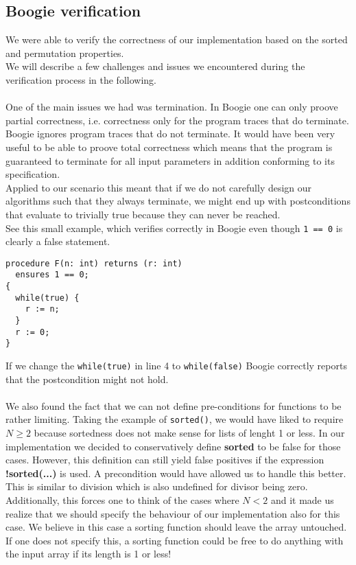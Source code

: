 \documentclass{report}
\begin{document}
\subsection{Boogie verification}
\label{s:boogie_verification}
We were able to verify the correctness of our implementation based on the sorted and permutation properties.\\
We will describe a few challenges and issues we encountered during the verification process in the following.
\\\\
One of the main issues we had was termination. In Boogie one can only proove partial correctness, i.e. correctness only for the program traces that do terminate.
Boogie ignores program traces that do not terminate. It would have been very useful to be able to proove total correctness which means that the program is
guaranteed to terminate for all input parameters in addition conforming to its specification.\\
Applied to our scenario this meant that if we do not carefully design our algorithms such that they always terminate, we might end up with postconditions that evaluate to trivially true because they can never be reached.\\
See this small example, which verifies correctly in Boogie even though \texttt{1 == 0} is clearly a false statement.
\begin{lstlisting}
procedure F(n: int) returns (r: int)
  ensures 1 == 0;
{
  while(true) {
    r := n;
  }
  r := 0;
}
\end{lstlisting}
If we change the \texttt{while(true)} in line 4 to \texttt{while(false)} Boogie correctly reports that the postcondition might not hold.
\\\\
We also found the fact that we can not define pre-conditions for functions to be rather limiting. Taking the example of \texttt{sorted()}, we would have liked to require $N \geq 2$ because sortedness does not make sense for lists of lenght 1 or less. In our implementation we decided to conservatively define \textbf{sorted} to be false for those cases. However, this definition can still yield false positives if the expression \textbf{!sorted(...)} is used. A precondition would have allowed us to handle this better. This is similar to division which is also undefined for divisor being zero.
\\
Additionally, this forces one to think of the cases where $N < 2$ and it made us realize that we should specify the behaviour of our implementation also for this case. We believe in this case a sorting function should leave the array untouched. If one does not specify this, a sorting function could be free to do anything with the input array if its length is 1 or less!
\end{document}
